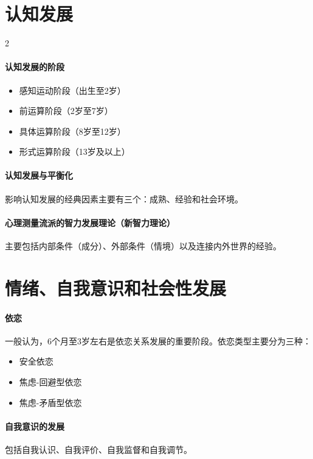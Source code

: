 \documentclass[b5paper,11pt]{article}
\begin{document}
\section{认知发展}
\begingroup
{}
\setlength{\columnsep}{1em}
\begin{paracol}{2}
  \paragraph{认知发展的阶段}
  \begin{itemize}
    \item 感知运动阶段（出生至2岁）
    \item 前运算阶段（2岁至7岁）
    \item 具体运算阶段（8岁至12岁）
    \item 形式运算阶段（13岁及以上）
  \end{itemize}

  \switchcolumn

  \paragraph{认知发展与平衡化}
  影响认知发展的经典因素主要有三个：成熟、经验和社会环境。

  \paragraph{心理测量流派的智力发展理论（新智力理论）}
  主要包括内部条件（成分）、外部条件（情境）以及连接内外世界的经验。
\end{paracol}
\endgroup

\section{情绪、自我意识和社会性发展}
\paragraph{依恋}
一般认为，6个月至3岁左右是依恋关系发展的重要阶段。依恋类型主要分为三种：
\begin{itemize}
  \item 安全依恋
  \item 焦虑-回避型依恋
  \item 焦虑-矛盾型依恋
\end{itemize}

\paragraph{自我意识的发展} 包括自我认识、自我评价、自我监督和自我调节。
\end{document}
